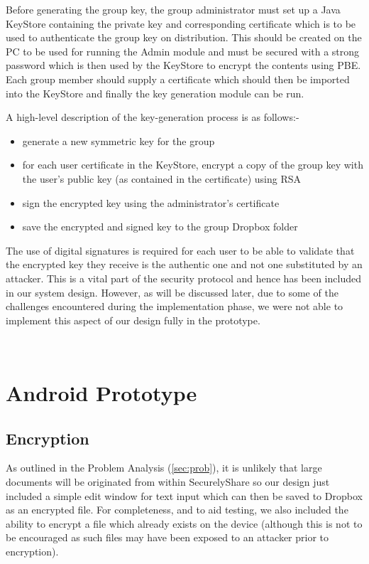 Before generating the group key, the group administrator must set up a Java KeyStore containing the private key and corresponding certificate which is to be used to authenticate the group key on distribution.  This should be created on the PC to be used for running the Admin module and must be secured with a strong password which is then used by the KeyStore to encrypt the contents using PBE.  Each group member should supply a certificate which should then be imported into the KeyStore and finally the key generation module can be run.  

A high-level description of the key-generation process is as follows:-
\begin{itemize}
\item generate a new  symmetric key for the group
\item for each user certificate in the KeyStore, encrypt a copy of the group key with the user's public key (as contained in the certificate) using RSA
\item sign the encrypted key using the administrator's certificate
\item save the encrypted and signed key to the group Dropbox folder 
\end{itemize}

The use of digital signatures is required for each user to be able to validate that the encrypted key they receive is the authentic one and not one substituted by an attacker.  This  is a vital part of the  security protocol and hence has been included in our  system design.  However, as will be discussed later, due to some of the challenges encountered during the implementation phase, we were not able to implement this aspect of our design fully in the prototype.


\\

\section{Android Prototype }

\subsection*{Encryption }
As outlined in the Problem Analysis  (\ref{sec:prob}), it is unlikely that large documents will be originated from within SecurelyShare so our design just included a simple  edit window for text input which can then be saved to Dropbox as an encrypted file.  For completeness, and to aid testing, we also included the ability to encrypt a file which already exists on the device (although this is not to be encouraged as such files may have been exposed to an attacker prior to encryption).



